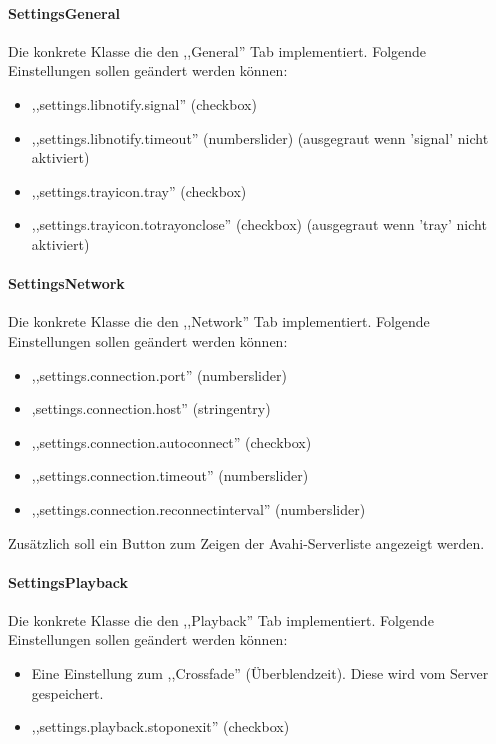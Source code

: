
\paragraph{SettingsGeneral}
Die konkrete Klasse die den ,,General'' Tab implementiert.
Folgende Einstellungen sollen geändert werden können:
\begin{itemize}
\item ,,settings.libnotify.signal'' (checkbox)
\item ,,settings.libnotify.timeout'' (numberslider) (ausgegraut wenn 'signal' nicht aktiviert)
\item ,,settings.trayicon.tray'' (checkbox)
\item ,,settings.trayicon.totrayonclose'' (checkbox) (ausgegraut wenn 'tray' nicht aktiviert)
\end{itemize}

\paragraph{SettingsNetwork}
Die konkrete Klasse die den ,,Network'' Tab implementiert.
Folgende Einstellungen sollen geändert werden können:
\begin{itemize}
\item ,,settings.connection.port'' (numberslider)
\item ,settings.connection.host'' (stringentry)
\item ,,settings.connection.autoconnect'' (checkbox)
\item ,,settings.connection.timeout'' (numberslider)
\item ,,settings.connection.reconnectinterval'' (numberslider)
\end{itemize}
Zusätzlich soll ein Button zum Zeigen der Avahi-Serverliste angezeigt werden.

\paragraph{SettingsPlayback}
Die konkrete Klasse die den ,,Playback'' Tab implementiert.
Folgende Einstellungen sollen geändert werden können:
\begin{itemize}
\item Eine Einstellung zum ,,Crossfade'' (Überblendzeit). Diese wird vom Server gespeichert.
\item ,,settings.playback.stoponexit'' (checkbox)
\end{itemize}

